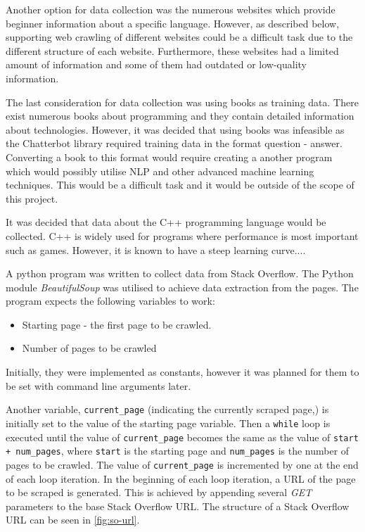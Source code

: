 \documentclass[12pt,a4paper]{article}
\begin{document}
Another option for data collection was the numerous websites which provide beginner information about a specific language. However, as described below, supporting web crawling of different websites could be a difficult task due to the different structure of each website. Furthermore, these websites had a limited amount of information and some of them had outdated or low-quality information.

The last consideration for data collection was using books as training data. There exist numerous books about programming and they contain detailed information about technologies. However, it was decided that using books was infeasible as the Chatterbot library required training data in the format question - answer. Converting a book to this format would require creating a another program which would possibly utilise NLP and other advanced machine learning techniques. This would be a difficult task and it would be outside of the scope of this project.

It was decided that data about the C++ programming language would be collected. C++ is widely used for programs where performance is most important such as games. However, it is known to have a steep learning curve....

A python program was written to collect data from Stack Overflow. The Python module \textit{BeautifulSoup} was utilised to achieve data extraction from the pages. The program expects the following variables to work:
\begin{itemize}
    \item Starting page - the first page to be crawled.
    \item Number of pages to be crawled
\end{itemize}

Initially, they were implemented as constants, however it was planned for them to be set with command line arguments later.

Another variable, \texttt{current\_page} (indicating the currently scraped page,) is initially set to the value of the starting page variable. Then a \texttt{while} loop is executed until the value of \texttt{current\_page} becomes the same as the value of \texttt{start + num\_pages}, where \texttt{start} is the starting page and \texttt{num\_pages} is the number of pages to be crawled. The value of \texttt{current\_page} is incremented by one at the end of each loop iteration. In the beginning of each loop iteration, a URL of the page to be scraped is generated. This is achieved by appending several \textit{GET} parameters to the base Stack Overflow URL. The structure of a Stack Overflow URL can be seen in \cref{fig:so-url}.
\end{document}
